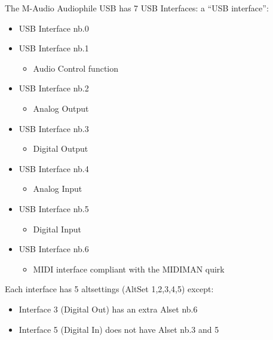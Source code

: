 \documentclass[a4paper,8pt,english]{sphinxmanual}
\begin{document}
The M-Audio Audiophile USB has 7 USB Interfaces:
a ``USB interface'':
\begin{itemize}
\item {} 
USB Interface nb.0

\item {} 
USB Interface nb.1
\begin{itemize}
\item {} 
Audio Control function

\end{itemize}

\item {} 
USB Interface nb.2
\begin{itemize}
\item {} 
Analog Output

\end{itemize}

\item {} 
USB Interface nb.3
\begin{itemize}
\item {} 
Digital Output

\end{itemize}

\item {} 
USB Interface nb.4
\begin{itemize}
\item {} 
Analog Input

\end{itemize}

\item {} 
USB Interface nb.5
\begin{itemize}
\item {} 
Digital Input

\end{itemize}

\item {} 
USB Interface nb.6
\begin{itemize}
\item {} 
MIDI interface compliant with the MIDIMAN quirk

\end{itemize}

\end{itemize}

Each interface has 5 altsettings (AltSet 1,2,3,4,5) except:
\begin{itemize}
\item {} 
Interface 3 (Digital Out) has an extra Alset nb.6

\item {} 
Interface 5 (Digital In) does not have Alset nb.3 and 5

\end{itemize}
\end{document}

